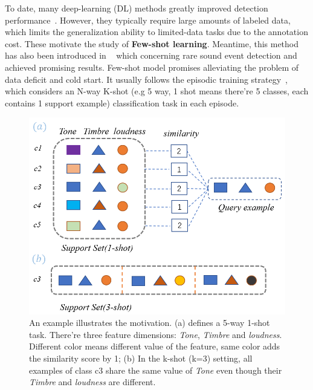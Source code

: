 \documentclass[a4paper]{article}
\begin{document}
To date, many deep-learning (DL) methods greatly improved detection performance~\cite{autoTagging,audiofew,song,park,few-shot-sound-detection}. However, they typically require large amounts of labeled data, which limits the generalization ability to limited-data tasks due to the annotation cost. These motivate the study of \textbf{Few-shot learning}. Meantime, this method has also been introduced in ~\cite{attentionSimilarity,rare,few-att-gnn,fewShotGNN,TPN} which concerning rare sound event detection and achieved promising results. Few-shot model promises alleviating the problem of data deficit and cold start. It usually follows the episodic training strategy~\cite{attentionSimilarity,MatchNet}, which considers an N-way K-shot (e.g 5 way, 1 shot means there’re 5 classes, each contains 1 support example) classification task in each episode.
\begin{figure}[t]
	\centering
	\includegraphics[width=\linewidth]{./pic/idea-3.png}
	\caption{An example illustrates the motivation. (a) defines a 5-way 1-shot task. There’re three feature dimensions: \textit{Tone}, \textit{Timbre} and \textit{loudness}. Different color means different value of the feature, same color adds the similarity score by 1; (b) In the k-shot (k=3) setting, all examples of class c3 share the same value of \textit{Tone} even though their \textit{Timbre} and \textit{loudness} are different. }
	\label{fig:idea}
	\vspace{-4mm}
\end{figure}
\end{document}
